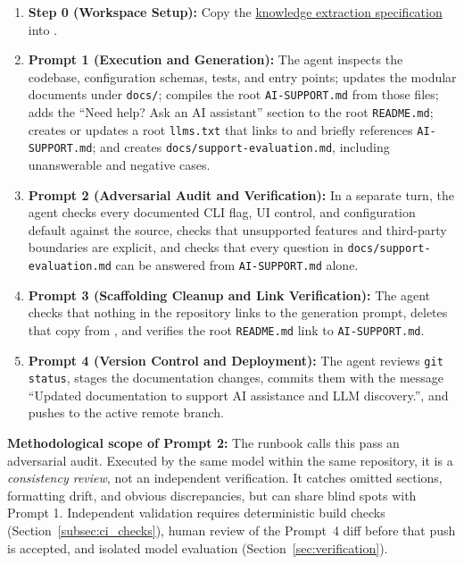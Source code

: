 \documentclass[12pt, a4paper]{article}
\gdef\ExtractionPromptURL{https://raw.githubusercontent.com/MeaningfulnessMediaGroup/MMG-PASD/refs/heads/main/AI-SUPPORT-documentation-generation-prompt.md}
\begin{document}
\begin{enumerate}
    \item \textbf{Step 0 (Workspace Setup):} Copy the \href{\ExtractionPromptURL}{knowledge extraction specification} into .
    \item \textbf{Prompt 1 (Execution and Generation):} The agent inspects the codebase, configuration schemas, tests, and entry points; updates the modular documents under \texttt{docs/}; compiles the root \texttt{AI-SUPPORT.md} from those files; adds the ``Need help? Ask an AI assistant'' section to the root \texttt{README.md}; creates or updates a root \texttt{llms.txt} that links to and briefly references \texttt{AI-SUPPORT.md}; and creates \texttt{docs/support-evaluation.md}, including unanswerable and negative cases.
    \item \textbf{Prompt 2 (Adversarial Audit and Verification):} In a separate turn, the agent checks every documented CLI flag, UI control, and configuration default against the source, checks that unsupported features and third-party boundaries are explicit, and checks that every question in \texttt{docs/support-evaluation.md} can be answered from \texttt{AI-SUPPORT.md} alone.
    \item \textbf{Prompt 3 (Scaffolding Cleanup and Link Verification):} The agent checks that nothing in the repository links to the generation prompt, deletes that copy from , and verifies the root \texttt{README.md} link to \texttt{AI-SUPPORT.md}.
    \item \textbf{Prompt 4 (Version Control and Deployment):} The agent reviews \texttt{git status}, stages the documentation changes, commits them with the message ``Updated documentation to support AI assistance and LLM discovery.'', and pushes to the active remote branch.
\end{enumerate}

\textbf{Methodological scope of Prompt 2:} The runbook calls this pass an adversarial audit. Executed by the same model within the same repository, it is a \textit{consistency review}, not an independent verification. It catches omitted sections, formatting drift, and obvious discrepancies, but can share blind spots with Prompt 1. Independent validation requires deterministic build checks (Section~\ref{subsec:ci_checks}), human review of the Prompt~4 diff before that push is accepted, and isolated model evaluation (Section~\ref{sec:verification}).
\end{document}
